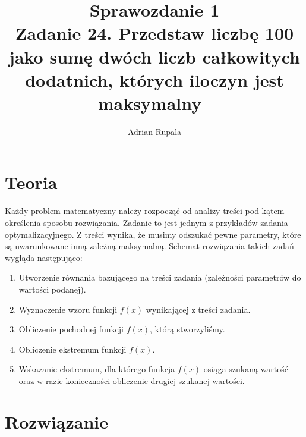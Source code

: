 \documentclass[UTF8]{article}
\title{%
	Sprawozdanie 1 \\
	\large Zadanie 24. Przedstaw liczbę 100 jako sumę dwóch liczb całkowitych dodatnich, których iloczyn jest maksymalny~}
\author{Adrian Rupala}
\begin{document}
\maketitle

\newpage
\tableofcontents

\newpage
{}

\section{Teoria}

Każdy problem matematyczny należy rozpocząć od analizy treści pod kątem określenia sposobu rozwiązania. Zadanie to jest jednym z przykładów zadania optymalizacyjnego. Z treści wynika, że musimy odszukać pewne parametry, które są uwarunkowane inną zależną maksymalną. Schemat rozwiązania takich zadań wygląda następująco: ~

\begin{enumerate}
	\item Utworzenie równania bazującego na treści zadania (zależności parametrów do wartości podanej).
	\item Wyznaczenie wzoru funkcji $f(x)$ wynikającej z treści zadania. ~
	\item Obliczenie pochodnej funkcji $f(x)$,  którą stworzyliśmy. ~
	\item Obliczenie ekstremum funkcji $f(x)$. ~
	\item Wskazanie ekstremum, dla którego funkcja $f(x)$ osiąga szukaną wartość oraz w razie konieczności obliczenie drugiej szukanej wartości. ~
\end{enumerate}

\section{Rozwiązanie}
\end{document}
